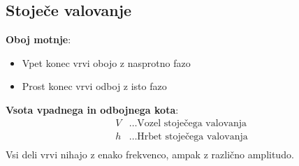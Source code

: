{\color{indiagreen}\subsection{Stoječe valovanje}}
\textbf{Oboj motnje}:
\begin{itemize}
	\item Vpet konec vrvi
	obojo z nasprotno fazo
	\item Prost konec vrvi
	odboj z isto fazo
\end{itemize}
\textbf{Vsota vpadnega in odbojnega kota}:
\begin{align*}
	V &\dots \text{Vozel stoječega valovanja}\\
	h &\dots \text{Hrbet stoječega valovanja}\\
\end{align*}
Vsi deli vrvi nihajo z enako frekvenco, ampak z različno amplitudo.